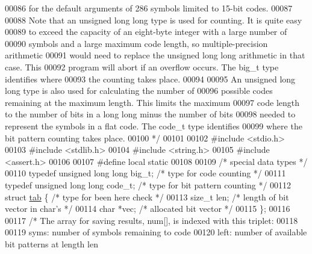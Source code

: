 \begin{DoxyCode}
00086 \textcolor{comment}{   for the default arguments of 286 symbols limited to 15-bit codes.}
00087 \textcolor{comment}{}
00088 \textcolor{comment}{   Note that an unsigned long long type is used for counting.  It is quite easy}
00089 \textcolor{comment}{   to exceed the capacity of an eight-byte integer with a large number of}
00090 \textcolor{comment}{   symbols and a large maximum code length, so multiple-precision arithmetic}
00091 \textcolor{comment}{   would need to replace the unsigned long long arithmetic in that case.  This}
00092 \textcolor{comment}{   program will abort if an overflow occurs.  The big\_t type identifies where}
00093 \textcolor{comment}{   the counting takes place.}
00094 \textcolor{comment}{}
00095 \textcolor{comment}{   An unsigned long long type is also used for calculating the number of}
00096 \textcolor{comment}{   possible codes remaining at the maximum length.  This limits the maximum}
00097 \textcolor{comment}{   code length to the number of bits in a long long minus the number of bits}
00098 \textcolor{comment}{   needed to represent the symbols in a flat code.  The code\_t type identifies}
00099 \textcolor{comment}{   where the bit pattern counting takes place.}
00100 \textcolor{comment}{ */}
00101 
00102 \textcolor{preprocessor}{#include <stdio.h>}
00103 \textcolor{preprocessor}{#include <stdlib.h>}
00104 \textcolor{preprocessor}{#include <string.h>}
00105 \textcolor{preprocessor}{#include <assert.h>}
00106 
00107 \textcolor{preprocessor}{#define local static}
00108 
00109 \textcolor{comment}{/* special data types */}
00110 \textcolor{keyword}{typedef} \textcolor{keywordtype}{unsigned} \textcolor{keywordtype}{long} \textcolor{keywordtype}{long} big\_t;   \textcolor{comment}{/* type for code counting */}
00111 \textcolor{keyword}{typedef} \textcolor{keywordtype}{unsigned} \textcolor{keywordtype}{long} \textcolor{keywordtype}{long} code\_t;  \textcolor{comment}{/* type for bit pattern counting */}
00112 \textcolor{keyword}{struct }\hyperlink{structtab}{tab} \{                        \textcolor{comment}{/* type for been here check */}
00113     \textcolor{keywordtype}{size\_t} len;         \textcolor{comment}{/* length of bit vector in char's */}
00114     \textcolor{keywordtype}{char} *vec;          \textcolor{comment}{/* allocated bit vector */}
00115 \};
00116 
00117 \textcolor{comment}{/* The array for saving results, num[], is indexed with this triplet:}
00118 \textcolor{comment}{}
00119 \textcolor{comment}{      syms: number of symbols remaining to code}
00120 \textcolor{comment}{      left: number of available bit patterns at length len}

\end{DoxyCode}
